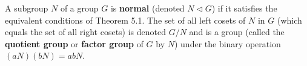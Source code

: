 \begin{definition}
A subgroup $N$ of a group $G$ is \textbf{normal} (denoted $N \triangleleft G$) if it satisfies the equivalent conditions of Theorem 5.1. The set of all left cosets of $N$ in $G$ (which equals the set of all right cosets) is denoted $G/N$ and is a group (called the \textbf{quotient group} or \textbf{factor group} of $G$ by $N$) under the binary operation $(aN)(bN) = abN$.
\end{definition}
